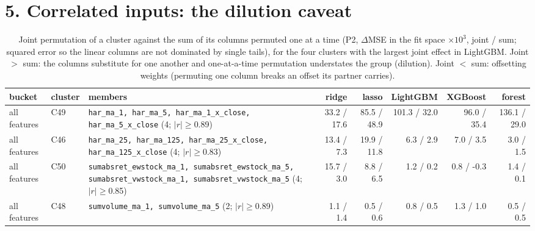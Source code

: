 \documentclass[10pt]{article}
\begin{document}
\section*{5. Correlated inputs: the dilution caveat}
\begin{table}[H]\centering\scriptsize
\caption{Joint permutation of a cluster against the sum of its columns permuted one at a time (P2, $\Delta$MSE in the fit space $\times10^{3}$, joint / sum; squared error so the linear columns are not dominated by single tails), for the four clusters with the largest joint effect in LightGBM. Joint $>$ sum: the columns substitute for one another and one-at-a-time permutation understates the group (dilution). Joint $<$ sum: offsetting weights (permuting one column breaks an offset its partner carries).}
\begin{tabular}{llp{5.2cm}rrrrr}\toprule
bucket & cluster & members & ridge & lasso & LightGBM & XGBoost & forest\\\midrule
all features & C49 & \texttt{har\_ma\_1, har\_ma\_5, har\_ma\_1\_x\_close, har\_ma\_5\_x\_close} (4; $|r|\ge$0.89) & 33.2 / 17.6 & 85.5 / 48.9 & 101.3 / 32.0 & 96.0 / 35.4 & 136.1 / 29.0 \\
all features & C46 & \texttt{har\_ma\_25, har\_ma\_125, har\_ma\_25\_x\_close, har\_ma\_125\_x\_close} (4; $|r|\ge$0.83) & 13.4 / 7.3 & 19.9 / 11.8 & 6.3 / 2.9 & 7.0 / 3.5 & 3.0 / 1.5 \\
all features & C50 & \texttt{sumabsret\_ewstock\_ma\_1, sumabsret\_ewstock\_ma\_5, sumabsret\_vwstock\_ma\_1, sumabsret\_vwstock\_ma\_5} (4; $|r|\ge$0.85) & 15.7 / 3.0 & 8.8 / 6.5 & 1.2 / 0.2 & 0.8 / -0.3 & 1.4 / 0.1 \\
all features & C48 & \texttt{sumvolume\_ma\_1, sumvolume\_ma\_5} (2; $|r|\ge$0.89) & 1.1 / 1.4 & 0.5 / 0.6 & 0.8 / 0.5 & 1.3 / 1.0 & 0.5 / 0.5 \\
\bottomrule\end{tabular}\end{table}
\end{document}
